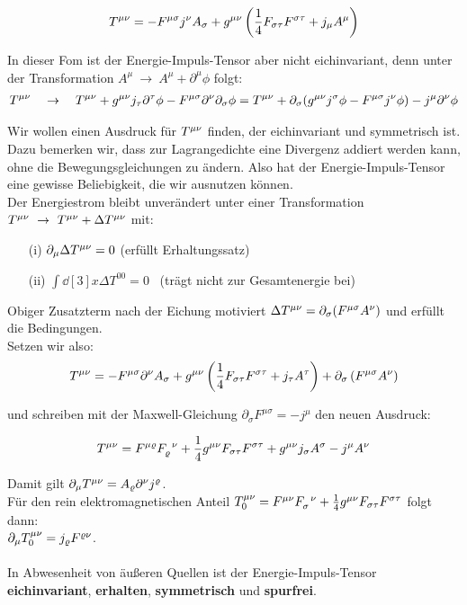 \begin{align}
T^{\mu\nu} = - F^{\mu\sigma}j^{\nu}A_{\sigma}+g^{\mu\nu}\left( \frac{1}{4} F_{\sigma\tau}F^{\sigma\tau}+j_{\mu}A^{\mu}\right)
\end{align}

In dieser Fom ist der Energie-Impuls-Tensor aber nicht eichinvariant, denn unter der Transformation $A^{\mu} \ \rightarrow \ A^{\mu} + \partial^{\mu}\phi$ folgt:
\begin{align}
T^{\mu\nu} \quad \rightarrow \quad T^{\mu\nu} + g^{\mu\nu}j_{\tau}\partial^{\tau}\phi-F^{\mu\sigma}\partial^{\nu}\partial_{\sigma}\phi = T^{\mu\nu} + \partial_{\sigma}(g^{\mu\nu}j^{\sigma}\phi - F^{\mu\sigma}j^{\nu}\phi) - j^{\mu}\partial^{\nu}\phi
\end{align}

Wir wollen einen Ausdruck für $T^{\mu\nu}$ finden, der eichinvariant und symmetrisch ist. \\
Dazu bemerken wir, dass zur Lagrangedichte eine Divergenz addiert werden kann, ohne die Bewegungsgleichungen zu ändern. Also hat der Energie-Impuls-Tensor eine gewisse Beliebigkeit, die wir ausnutzen können. \\
Der Energiestrom bleibt unverändert unter einer Transformation $T^{\mu\nu} \ \rightarrow \ T^{\mu\nu}+ \Delta T^{\mu\nu}$ mit: 

\begin{enumerate}
\item[(i)] $\partial_{\mu}\Delta T^{\mu\nu}=0$ \qquad (erfüllt Erhaltungssatz)
\item[(ii)] $ \int \dd[3]{x} \Delta T^{00} =0$ \qquad \ (trägt nicht zur Gesamtenergie bei)
\end{enumerate}

Obiger Zusatzterm nach der Eichung motiviert $\Delta T^{\mu\nu}=\partial_{\sigma}(F^{\mu\sigma}A^{\nu})$ und erfüllt die Bedingungen. \\
Setzen wir also:
\begin{align}
T^{\mu\nu} = -F^{\mu\sigma}\partial^{\nu}A_{\sigma} + g^{\mu\nu}\left( \frac{1}{4}F_{\sigma\tau}F^{\sigma\tau} + j_{\tau}A^{\tau} \right) + \partial_{\sigma} \left(F^{\mu\sigma}A^{\nu} \right)
\end{align}

und schreiben mit der Maxwell-Gleichung $\partial_{\sigma}F^{\mu\sigma}=-j^{\mu}$ den neuen Ausdruck:

\begin{align}
T^{\mu\nu} = F^{\mu\varrho}F_{\varrho}^{\phantom{\varrho}\nu} + \frac{1}{4}g^{\mu\nu}F_{\sigma\tau}F^{\sigma\tau} + g^{\mu\nu}j_{\sigma}A^{\sigma} - j^{\mu}A^{\nu}
\end{align}

Damit gilt $\partial_{\mu}T^{\mu\nu} = A_{\varrho}\partial^{\nu}j^{\varrho}$. \\
Für den rein elektromagnetischen Anteil $T^{\mu\nu}_0 = F^{\mu \nu} F_{\sigma}^{\phantom{\sigma}\nu} + \frac{1}{4}g^{\mu\nu}F_{\sigma\tau}F^{\sigma\tau}$ folgt dann: \\ $\partial_{\mu}T^{\mu\nu}_0=j_{\varrho}F^{\varrho\nu}$. \\
\vspace{1pt} \\
In Abwesenheit von äußeren Quellen ist der Energie-Impuls-Tensor \textbf{eichinvariant}, \textbf{erhalten}, \textbf{symmetrisch} und \textbf{spurfrei}.

